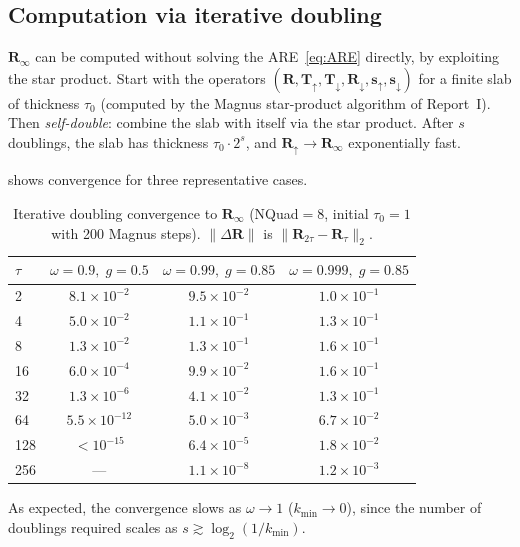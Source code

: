 \documentclass[11pt,a4paper]{article}
\newcommand{\vect}[1]{\bm{#1}}
\newcommand{\mat}[1]{\mathbf{#1}}
\newcommand{\kmin}{k_{\min}}
\newcommand{\Rinf}{\mat{R}_\infty}
\theoremstyle{definition}
\begin{document}
\subsection{Computation via iterative doubling}

$\Rinf$ can be computed without solving the
ARE~\eqref{eq:ARE} directly, by exploiting the star product.
Start with the operators $(\mat{R},\mat{T}_\uparrow,\mat{T}_\downarrow,\mat{R}_\downarrow,\vect{s}_\uparrow,\vect{s}_\downarrow)$ for a finite slab of thickness $\tau_0$
(computed by the Magnus star-product algorithm of Report~I).  Then
\emph{self-double}: combine the slab with itself via the star product.
After $s$ doublings, the slab has thickness $\tau_0\cdot 2^s$, and
$\mat{R}_\uparrow\to\Rinf$ exponentially fast.

 shows convergence for three representative cases.

\begin{table}[h]\centering
\caption{Iterative doubling convergence to $\Rinf$ (NQuad${}=8$,
initial $\tau_0=1$ with 200 Magnus steps).  $\|\Delta\mat{R}\|$ is
$\|\mat{R}_{2\tau}-\mat{R}_\tau\|_2$.}\label{tab:doubling}
\begin{tabular}{lccc}
\toprule
$\tau$ & $\omega=0.9,\;g=0.5$ & $\omega=0.99,\;g=0.85$ & $\omega=0.999,\;g=0.85$ \\
\midrule
  2  & $8.1\times 10^{-2}$ & $9.5\times 10^{-2}$ & $1.0\times 10^{-1}$ \\
  4  & $5.0\times 10^{-2}$ & $1.1\times 10^{-1}$ & $1.3\times 10^{-1}$ \\
  8  & $1.3\times 10^{-2}$ & $1.3\times 10^{-1}$ & $1.6\times 10^{-1}$ \\
 16  & $6.0\times 10^{-4}$ & $9.9\times 10^{-2}$ & $1.6\times 10^{-1}$ \\
 32  & $1.3\times 10^{-6}$ & $4.1\times 10^{-2}$ & $1.3\times 10^{-1}$ \\
 64  & $5.5\times 10^{-12}$ & $5.0\times 10^{-3}$ & $6.7\times 10^{-2}$ \\
128  & $< 10^{-15}$ & $6.4\times 10^{-5}$ & $1.8\times 10^{-2}$ \\
256  & ---          & $1.1\times 10^{-8}$ & $1.2\times 10^{-3}$ \\
\bottomrule
\end{tabular}
\end{table}

As expected, the convergence slows as $\omega\to 1$ ($\kmin\to 0$),
since the number of doublings required scales as
$s\gtrsim \log_2(1/\kmin)$.
\end{document}
